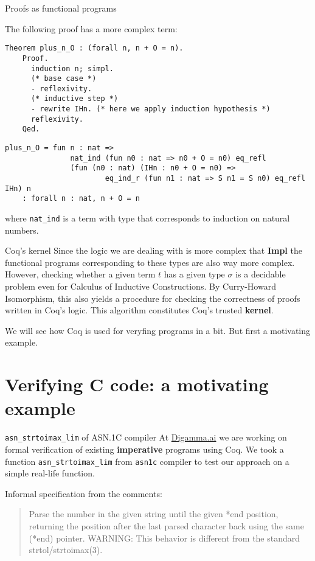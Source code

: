 \documentclass[10pt]{beamer}
\begin{document}
\begin{frame}[fragile]{Proofs as functional programs}

  The following proof has a more complex term:
  
  \begin{lstlisting}[language=Coq]
    Theorem plus_n_O : (forall n, n + O = n).
    Proof.
      induction n; simpl.
      (* base case *)
      - reflexivity.
      (* inductive step *)
      - rewrite IHn. (* here we apply induction hypothesis *)
      reflexivity.
    Qed.
  \end{lstlisting}


  \begin{lstlisting}[language=Coq]
    plus_n_O = fun n : nat =>
               nat_ind (fun n0 : nat => n0 + O = n0) eq_refl
               (fun (n0 : nat) (IHn : n0 + O = n0) =>
                       eq_ind_r (fun n1 : nat => S n1 = S n0) eq_refl IHn) n
    : forall n : nat, n + O = n
  \end{lstlisting}
  
  where \texttt{nat\_ind} is a term with type that corresponds to induction on natural numbers.

\end{frame}
\begin{frame}{Coq's kernel}
  Since the logic we are dealing with is more complex that {\bf Impl} the functional programs corresponding to these types are also way more complex. However, checking whether a given term $t$ has a given type $\sigma$ is a decidable problem even for Calculus of Inductive Constructions. By Curry-Howard Isomorphism, this also yields a procedure for checking the correctness of proofs written in Coq's logic.  This algorithm constitutes Coq's trusted {\bf kernel}.

\end{frame}

\begin{frame}
 We will see how Coq is used for veryfing programs in a bit. But first a motivating example.
\end{frame}

\section{Verifying C code: a motivating example}

\begin{frame}{\texttt{asn\_strtoimax\_lim} of ASN.1C compiler}
  At \url{Digamma.ai} we are working on formal verification of existing {\bf imperative} programs using Coq. We took a function \texttt{asn\_strtoimax\_lim} from \texttt{asn1c} compiler to test our approach on a simple real-life function.
  

  Informal specification from the comments: 

 \begin{quote}
 Parse the number in the given string until the given *end position,
 returning the position after the last parsed character back using the
 same (*end) pointer.
 WARNING: This behavior is different from the standard strtol/strtoimax(3).
\end{quote}
\end{frame}
\end{document}
